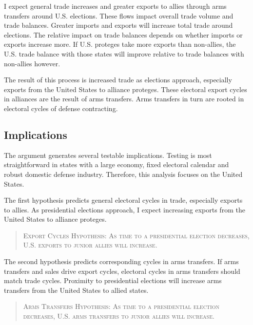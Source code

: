 \documentclass[12pt]{article}
\begin{document}
I expect general trade increases and greater exports to allies through arms transfers around U.S. elections.
These flows impact overall trade volume and trade balances.
Greater imports and exports will increase total trade around elections. 
The relative impact on trade balances depends on whether imports or exports increase more. 
If U.S. proteges take more exports than non-allies, the U.S. trade balance with those states will improve relative to trade balances with non-allies however.


The result of this process is increased trade as elections approach, especially exports from the United States to alliance proteges.
These electoral export cycles in alliances are the result of arms transfers. 
Arms transfers in turn are rooted in electoral cycles of defense contracting.




\subsection{Implications}



The argument generates several testable implications. 
Testing is most straightforward in states with a large economy, fixed electoral calendar and robust domestic defense industry. 
Therefore, this analysis focuses on the United States. 


The first hypothesis predicts general electoral cycles in trade, especially exports to allies. 
As presidential elections approach, I expect increasing exports from the United States to alliance proteges.


\begin{quote}
\textsc{Export Cycles Hypothesis: As time to a presidential election decreases, U.S. exports to junior allies will increase.}
\end{quote}



The second hypothesis predicts corresponding cycles in arms transfers.
If arms transfers and sales drive export cycles, electoral cycles in arms transfers should match trade cycles.
Proximity to presidential elections will increase arms transfers from the United States to allied states. 


\begin{quote}
\textsc{Arms Transfers Hypothesis: As time to a presidential election decreases, U.S. arms transfers to junior allies will increase.}
\end{quote}
\end{document}
